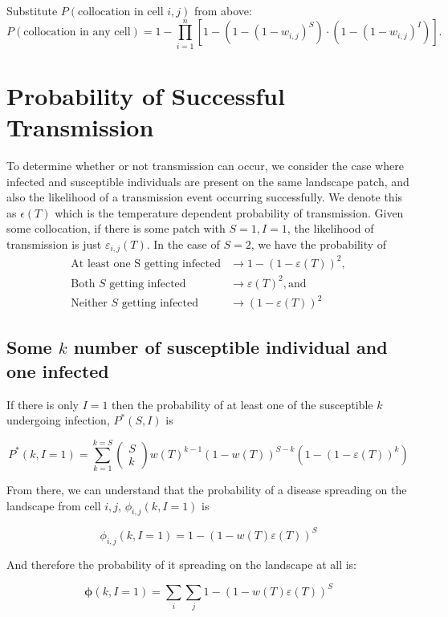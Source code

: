 \documentclass[11pt]{article}
\begin{document}
Substitute $P(\text{collocation in cell } i,j)$ from above:
\begin{equation}
P(\text{collocation in any cell}) = 1 - \prod_{i=1}^n \left[ 1 - \left( 1 - (1 - w_{i,j})^S \right) \cdot \left( 1 - (1 - w_{i,j})^I \right) \right].
\end{equation}

\section{Probability of Successful Transmission}

To determine whether or not transmission can occur, we consider the case where infected and susceptible individuals are present on the same landscape patch, and also the likelihood of a transmission event occurring successfully. We denote this as $\epsilon(T)$ which is the temperature dependent probability of transmission.  Given some collocation, if there is some patch with $S = 1, I = 1$, the likelihood of transmission is just $\varepsilon_{i,j}(T)$. In the case of $S = 2$, we have the probability of 
\begin{align}
    \text{At least one S getting infected} &\rightarrow 1 - (1- \varepsilon(T))^2, \\
    \text{Both } S \text{ getting infected} &\rightarrow \varepsilon(T)^2, \text{and} \\
    \text{Neither } S \text{ getting infected} &\rightarrow (1 - \varepsilon(T))^2
\end{align}

\subsection{Some $k$ number of susceptible individual and one infected}

If there is only $I = 1$ then the probability of at least one of the susceptible $k$ undergoing infection, $P^*(S, I)$ is

\begin{equation}
    P^*(k, I=1) = \sum^{k=S}_{k = 1}\begin{pmatrix} S\\ k \end{pmatrix} w(T)^{k-1}(1-w(T))^{S-k}(1 - (1-\varepsilon(T))^k)
\end{equation}

From there, we can understand that the probability of a disease spreading on the landscape from cell $i,j$, $\phi_{i,j}(k, I = 1)$ is 

\begin{equation}
    \phi_{i,j}(k, I = 1) = 1 - (1 - w(T) \varepsilon(T))^S
\end{equation}

And therefore the probability of it spreading on the landscape at all is:

\begin{equation}
    \boldsymbol{\phi}(k, I = 1) = \sum_i \sum_j 1 - (1 - w(T) \varepsilon(T))^S
\end{equation}
\end{document}
